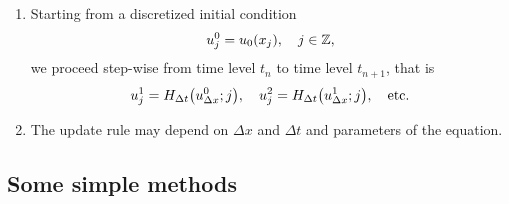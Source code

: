 \begin{remark}
	\begin{enumerate}
		\item Starting from a discretized initial condition
		\[
			u_j^0 = u_0\parentheses*{x_j}, \quad j \in \Z,
		\]
		we proceed step-wise from time level \(t_n\) to time level \(t_{n + 1}\), that is
		\[
			u_j^1 = H_{\Delta t}\parentheses*{u_{\Delta x}^0; j}, \quad u_j^2 = H_{\Delta t}\parentheses*{u_{\Delta x}^1; j}, \quad \text{etc.}
		\]
		\item The update rule may depend on \(\Delta x\) and \(\Delta t\) and parameters of the equation.
	\end{enumerate}
\end{remark}


\subsection{Some simple methods}

